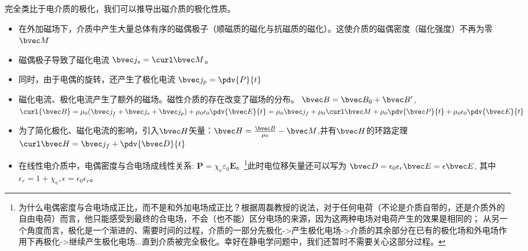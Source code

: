 
完全类比于电介质的极化，我们可以推导出磁介质的极化性质。

\begin{itemize}
\item 在外加磁场下，介质中产生大量总体有序的磁偶极子（顺磁质的磁化与抗磁质的磁化）。这使介质的磁偶密度（磁化强度）不再为零$\bvec M$

\item 磁偶极子导致了磁化电流 $\bvec j_s = \curl \bvec M$。
\item 同时，由于电偶的旋转，还产生了极化电流 $\bvec j_p = \pdv{P}{t}$  %

\item 磁化电流、极化电流产生了额外的磁场。磁性介质的存在改变了磁场的分布。 $\bvec B = \bvec B_0 + \bvec B'$, $\curl {\bvec B} = \mu_0 (\bvec j_f + \bvec j_s + \bvec j_p) + \mu_0\epsilon_0 \pdv{\bvec E}{t} = \mu_0 \bvec j_f + \mu_0 \curl \bvec M + \mu_0 \pdv{\bvec P}{t} + \mu_0 \epsilon_0 \pdv{\bvec E}{t}$

\item 为了简化极化、磁化电流的影响，引入$\bvec H$矢量：$\bvec H = \frac{\bvec B}{\mu_0} - \bvec M$,并有$\bvec H$的环路定理 $\curl \bvec H = \bvec j_f + \pdv{\bvec D}{t}$

\item 在线性电介质中，电偶密度与合电场成线性关系: $\mathbf P=\chi_{\mathrm e} \varepsilon_{0} \mathbf E$。\footnote{为什么电偶密度与合电场成正比，而不是和外加电场成正比？根据周磊教授的说法，对于任何电荷（不论是介质自带的，还是介质外的自由电荷）而言，他只能感受到最终的合电场，不会（也不能）区分电场的来源，因为这两种电场对电荷产生的效果是相同的；
从另一个角度而言，极化是一个渐进的、需要时间的过程，介质的一部分先极化->产生极化电场->介质的其余部分在已有的极化场和外电场作用下再极化->继续产生极化电场...直到介质被完全极化。幸好在静电学问题中，我们还暂时不需要关心这部分过程。}此时电位移矢量还可以写为 $\bvec D = \epsilon_0 \epsilon_r \bvec E = \epsilon \bvec E $, 其中$\epsilon_r = 1+\chi_{\mathrm e}, \epsilon = \epsilon_0 \epsilon_r$。
\end{itemize}